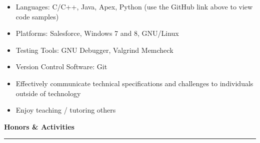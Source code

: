 \documentclass[10pt,letterpaper]{article}
\begin{document}
	\begin{minipage}[t]{0.53\textwidth}
          \begin{flushleft}
            \begin{itemize}
              \setlength\itemsep{-0.10em}
            \item Languages: C/C++, Java, Apex, Python (use the GitHub
              link above to view code samples)
            \item Platforms: Salesforce, Windows 7 and 8, GNU/Linux
            \item Testing Tools: GNU Debugger, Valgrind Memcheck
            \item Version Control Software: Git
            \end{itemize}
          \end{flushleft}
	\end{minipage}
	\begin{minipage}[t]{0.44\textwidth}
          \begin{flushright}
            \begin{flushleft}
              \begin{itemize}
                \setlength\itemsep{-0.10em}
              \item Effectively communicate technical specifications
                and challenges to individuals outside of technology
              \item Enjoy teaching / tutoring others
              \end{itemize}
            \end{flushleft}
          \end{flushright}
	\end{minipage}
	
	\medskip
	
	\begin{large}
          \textbf{Honors \& Activities}
	\end{large}
	
	\smallskip \hrule \smallskip
	
\end{document}
